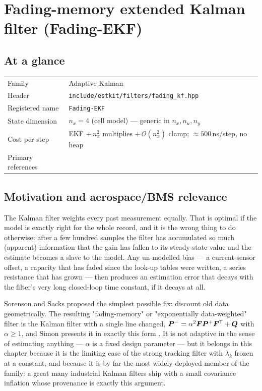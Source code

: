 \chapter{Fading-memory extended Kalman filter (Fading-EKF)}
\label{ch:fadingekf}

\section*{At a glance}
\begin{tabular}{@{}l>{\raggedright\arraybackslash}p{}@{}}
Family & Adaptive Kalman \\
Header & \texttt{include/estkit/filters/fading\_kf.hpp} \\
Registered name & \texttt{Fading-EKF} \\
State dimension & $n_x = 4$ (cell model) --- generic in $n_x, n_u, n_y$ \\
Cost per step & EKF $+\,n_x^2$ multiplies $+\,\mathcal{O}(n_x^2)$ clamp; $\approx 500$\,ns/step, no heap \\
Primary references & \cite{sorenson1971fading,simon2006,andersonmoore1979,jazwinski1970} \\
\end{tabular}

\section{Motivation and aerospace/BMS relevance}
The Kalman filter weights every past measurement equally.  That is optimal if the model is exactly
right for the whole record, and it is the wrong thing to do otherwise: after a few hundred samples
the filter has accumulated so much (apparent) information that the gain has fallen to its
steady-state value and the estimate becomes a slave to the model.  Any un-modelled bias --- a
current-sensor offset, a capacity that has faded since the look-up tables were written, a series
resistance that has grown --- then produces an estimation error that decays with the filter's very
long closed-loop time constant, if it decays at all.

Sorenson and Sacks \cite{sorenson1971fading} proposed the simplest possible fix: discount old data
geometrically.  The resulting "fading-memory" or "exponentially data-weighted" filter is the Kalman
filter with a single line changed, $\bm{P}^{-} = \alpha^2\bm{F}\bm{P}^{+}\bm{F}^{\mathsf{T}}+\bm{Q}$ with $\alpha\ge1$, and
Simon presents it in exactly this form \cite[Sec.~7.4]{simon2006}.  It is not adaptive in the sense
of estimating anything --- $\alpha$ is a fixed design parameter --- but it belongs in this chapter
because it is the limiting case of the strong tracking filter with $\lambda_k$ frozen at a constant,
and because it is by far the most widely deployed member of the family: a great many industrial
Kalman filters ship with a small covariance inflation whose provenance is exactly this argument.

